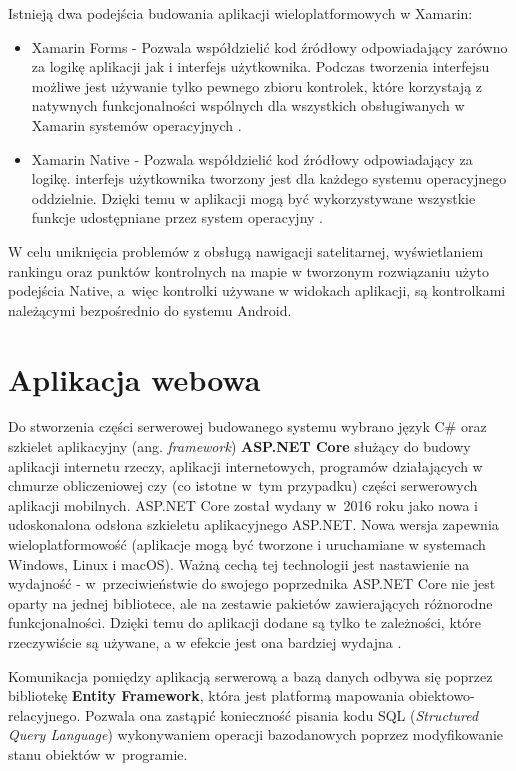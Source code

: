 Istnieją dwa podejścia budowania aplikacji wieloplatformowych w Xamarin:
\begin {itemize}
\item{Xamarin Forms} - Pozwala współdzielić kod źródłowy odpowiadający zarówno za logikę aplikacji jak i interfejs użytkownika. Podczas tworzenia interfejsu możliwe jest używanie tylko pewnego zbioru kontrolek, które korzystają z natywnych funkcjonalności wspólnych dla wszystkich obsługiwanych w Xamarin systemów operacyjnych \cite{xamarin-forms}. 
\item{Xamarin Native} - Pozwala współdzielić kod źródłowy odpowiadający za logikę. interfejs użytkownika tworzony jest dla każdego systemu operacyjnego oddzielnie. Dzięki temu w aplikacji mogą być wykorzystywane wszystkie funkcje udostępniane przez system operacyjny \cite{xamarin-native}.
\end{itemize}
W celu uniknięcia problemów z obsługą nawigacji satelitarnej, wyświetlaniem rankingu oraz punktów kontrolnych na mapie w tworzonym rozwiązaniu użyto podejścia Native, a~więc kontrolki używane w widokach aplikacji, są kontrolkami należącymi bezpośrednio do systemu Android.

\section{Aplikacja webowa}
Do stworzenia części serwerowej budowanego systemu wybrano język C\# oraz szkielet aplikacyjny (ang. \textit{framework}) \textbf{ASP.NET Core} służący do budowy aplikacji internetu rzeczy, aplikacji internetowych, programów działających w chmurze obliczeniowej czy (co istotne w~tym przypadku) części serwerowych aplikacji mobilnych. ASP.NET Core został wydany w~2016 roku jako nowa i udoskonalona odsłona szkieletu aplikacyjnego ASP.NET. Nowa wersja zapewnia wieloplatformowość (aplikacje mogą być tworzone i uruchamiane w systemach Windows, Linux i macOS). Ważną cechą tej technologii jest nastawienie na wydajność - w~przeciwieństwie do swojego poprzednika ASP.NET Core nie jest oparty na jednej bibliotece, ale na zestawie pakietów zawierających różnorodne funkcjonalności. Dzięki temu do aplikacji dodane są tylko te zależności, które rzeczywiście są używane, a w efekcie jest ona bardziej wydajna \cite{ksiazka-asp-core}.

Komunikacja pomiędzy aplikacją serwerową a bazą danych odbywa się poprzez bibliotekę \textbf{Entity Framework}, która jest platformą mapowania obiektowo-relacyjnego. Pozwala ona zastąpić konieczność pisania kodu SQL (\textit{Structured Query Language}) \cite{sql} wykonywaniem operacji bazodanowych poprzez modyfikowanie stanu obiektów w~programie.

